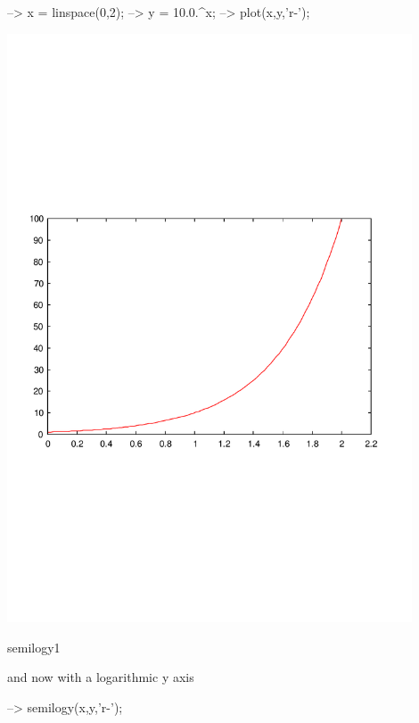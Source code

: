 \begin{DoxyVerbInclude}
--> x = linspace(0,2);
--> y = 10.0.^x;
--> plot(x,y,'r-');
\end{DoxyVerbInclude}


 
\begin{DoxyImage}
\includegraphics[width=12cm]{semilogy1}
\caption{semilogy1}
\end{DoxyImage}
 and now with a logarithmic y axis


\begin{DoxyVerbInclude}
--> semilogy(x,y,'r-');
\end{DoxyVerbInclude}


